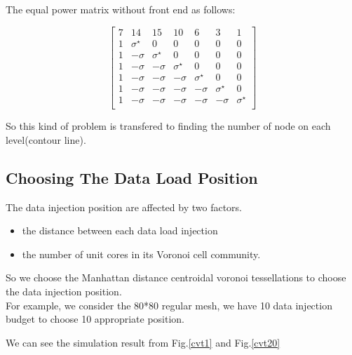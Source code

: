 \vspace*{20pt}
The equal power matrix without front end as follows:

\begin{equation}
{
\left[ \begin{array}{ccccccc}
7 & 14 & 15 & 10 & 6 & 3 & 1 \\
1 & {\sigma}^{\star} & 0 & 0 & 0 & 0 & 0 \\
1 & -\sigma & {\sigma}^{\star} & 0 & 0 & 0 & 0 \\
1 & -\sigma & -\sigma & {\sigma}^{\star} & 0 & 0 & 0 \\
1 & -\sigma & -\sigma & -\sigma & {\sigma}^{\star} & 0 & 0\\
1 & -\sigma & -\sigma & -\sigma & -\sigma & {\sigma}^{\star}  & 0\\
1 & -\sigma & -\sigma & -\sigma & -\sigma & -\sigma & {\sigma}^{\star}\\

\end{array} 
\right ]} 
\end{equation}

So this kind of problem is transfered to finding the number of node on each level(contour line).

\vspace*{50pt}
\subsection{Choosing The Data Load Position}
The data injection position are affected by two factors. 

\begin{itemize}
\item the distance between each data load injection
\item the number of unit cores in its Voronoi cell community.
\end{itemize}

So we choose the Manhattan distance centroidal voronoi tessellations\cite{du1999centroidal} to choose the data injection position.
\\
For example, we consider the 80*80 regular mesh, we have 10 data injection budget to choose 10 appropriate position.

We can see the simulation result from Fig.\ref{cvt1} and Fig.\ref{cvt20}
\vspace*{20pt}

